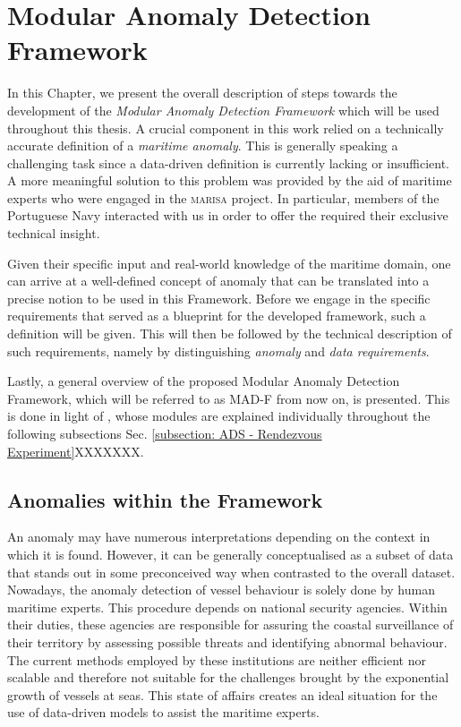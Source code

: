 \chapter{Modular Anomaly Detection Framework}
\label{chapter:Chapter 3}

In this Chapter, we present the overall description of steps towards the development of the \emph{Modular Anomaly Detection Framework} which will be used throughout this thesis. 
A crucial component in this work relied on a technically accurate definition of a \emph{maritime anomaly}. This is generally speaking a challenging task since a data-driven definition is currently lacking or insufficient. A more meaningful solution to this problem was provided by the aid of maritime experts who were engaged in the \textsc{marisa} project. In particular, members of the Portuguese Navy interacted with us in order to offer the required their exclusive technical insight.

Given their specific input and real-world knowledge of the maritime domain, one can arrive at a well-defined concept of anomaly that can be translated into a precise notion to be used in this Framework. Before we engage in the specific requirements that served as a blueprint for the developed framework, such a definition will be given. This will then be followed by the technical description of such requirements, namely by distinguishing \emph{anomaly} and \emph{data requirements}.

Lastly, a general overview of the proposed Modular Anomaly Detection Framework, which will be referred to as MAD-F from now on, is presented. This is done in light of , whose modules are explained individually throughout the following subsections Sec. \ref{subsection: ADS - Rendezvous Experiment}XXXXXXX.


\section{Anomalies within the Framework}
\label{section: Framework Requirements}
An anomaly may have numerous interpretations depending on the context in which it is found. However, it can be generally conceptualised as a subset of data that stands out in some preconceived way when contrasted to the overall dataset. Nowadays, the anomaly detection of vessel behaviour is solely done by human maritime experts. This procedure depends on national security agencies. Within their duties, these agencies are responsible for assuring the coastal surveillance of their territory by assessing possible threats and identifying abnormal behaviour. The current methods employed by these institutions are neither efficient nor scalable and therefore not suitable for the challenges brought by the exponential growth of vessels at seas. This state of affairs creates an ideal situation for the use of data-driven models to assist the maritime experts.

